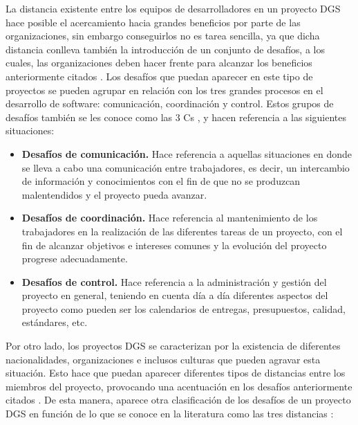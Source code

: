 La distancia existente entre los equipos de desarrolladores en un proyecto DGS hace posible el acercamiento hacia grandes beneficios por parte de las organizaciones, sin embargo conseguirlos no es tarea sencilla, ya que dicha distancia conlleva también la introducción de un conjunto de desafíos, a los cuales, las organizaciones deben hacer frente para alcanzar los beneficios anteriormente citados \cite{conchuir2006exploring}. Los desafíos que puedan aparecer en este tipo de proyectos se pueden agrupar en relación con los tres grandes procesos en el desarrollo de software: comunicación, coordinación y control. Estos grupos de desafíos también se les conoce como las 3 Cs \cite{vizcaino2015vision, piattini2014desarrollo}, y hacen referencia a las siguientes situaciones:

\begin{itemize}
	\item \textbf{Desafíos de comunicación.} Hace referencia a aquellas situaciones en donde se lleva a cabo una comunicación entre trabajadores, es decir, un intercambio de información y conocimientos con el fin de que no se produzcan malentendidos y el proyecto pueda avanzar.
	\item \textbf{Desafíos de coordinación.} Hace referencia al mantenimiento de los trabajadores en la realización de las diferentes tareas de un proyecto, con el fin de alcanzar objetivos e intereses comunes y la evolución del proyecto progrese adecuadamente.
	\item \textbf{Desafíos de control.} Hace referencia a la administración y gestión del proyecto en general, teniendo en cuenta día a día diferentes aspectos del proyecto como pueden ser los calendarios de entregas, presupuestos, calidad, estándares, etc. 
\end{itemize}

Por otro lado, los proyectos DGS se caracterizan por la existencia de diferentes nacionalidades, organizaciones e inclusos culturas que pueden agravar esta situación. Esto hace que puedan aparecer diferentes tipos de distancias entre los miembros del proyecto, provocando una acentuación en los desafíos anteriormente citados \cite{vizcaino2015vision}. De esta manera, aparece otra clasificación de los desafíos de un proyecto DGS en función de lo que se conoce en la literatura como las tres distancias \cite{vizcaino2015vision, conchuir2006exploring, conchuir2009global}:

